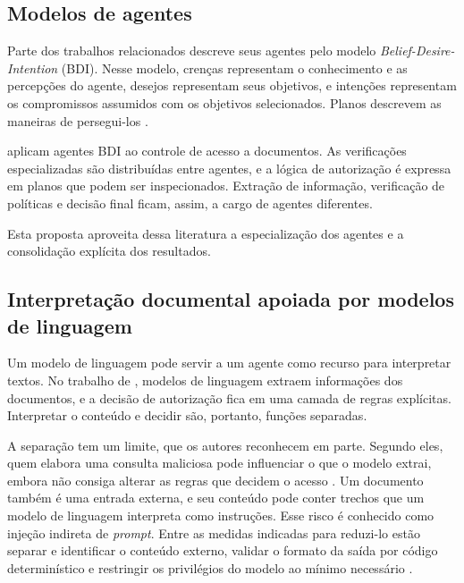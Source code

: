 \subsection{Modelos de agentes}
\label{rt-2-3-2}

Parte dos trabalhos relacionados descreve seus agentes pelo modelo \textit{Belief-Desire-Intention} (BDI). Nesse modelo, crenças representam o conhecimento e as percepções do agente, desejos representam seus objetivos, e intenções representam os compromissos assumidos com os objetivos selecionados. Planos descrevem as maneiras de persegui-los \cite{raoGeorgeff1995,lazarin2025}.

 aplicam agentes BDI ao controle de acesso a documentos. As verificações especializadas são distribuídas entre agentes, e a lógica de autorização é expressa em planos que podem ser inspecionados. Extração de informação, verificação de políticas e decisão final ficam, assim, a cargo de agentes diferentes.

Esta proposta aproveita dessa literatura a especialização dos agentes e a consolidação explícita dos resultados.

\subsection{Interpretação documental apoiada por modelos de linguagem}
\label{rt-2-3-3}

Um modelo de linguagem pode servir a um agente como recurso para interpretar textos. No trabalho de , modelos de linguagem extraem informações dos documentos, e a decisão de autorização fica em uma camada de regras explícitas. Interpretar o conteúdo e decidir são, portanto, funções separadas.

A separação tem um limite, que os autores reconhecem em parte. Segundo eles, quem elabora uma consulta maliciosa pode influenciar o que o modelo extrai, embora não consiga alterar as regras que decidem o acesso \cite{yesil2026}. Um documento também é uma entrada externa, e seu conteúdo pode conter trechos que um modelo de linguagem interpreta como instruções. Esse risco é conhecido como injeção indireta de \textit{prompt}. Entre as medidas indicadas para reduzi-lo estão separar e identificar o conteúdo externo, validar o formato da saída por código determinístico e restringir os privilégios do modelo ao mínimo necessário \cite{owaspLlm01}.

